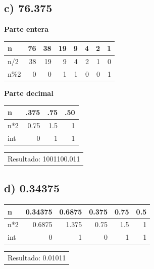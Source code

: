 \documentclass[12pt]{article}
\begin{document}
\subsection*{c) 76.375}
\label{sec:orgbfe72b2}
\begin{mdframed}
\textbf{Parte entera}
\begin{center}
\begin{tabular}{lrrrrrrr}
n & 76 & 38 & 19 & 9 & 4 & 2 & 1\\
\hline
n/2 & 38 & 19 & 9 & 4 & 2 & 1 & 0\\
n\%2 & 0 & 0 & 1 & 1 & 0 & 0 & 1\\
\end{tabular}
\end{center}

\textbf{Parte decimal}
\begin{center}
\begin{tabular}{lrrr}
n & .375 & .75 & .50\\
\hline
n*2 & 0.75 & 1.5 & 1\\
int & 0 & 1 & 1\\
\end{tabular}
\end{center}

\begin{center}
\begin{tabular}{l}
Resultado: 1001100.011\\
\end{tabular}
\end{center}
\end{mdframed}

\subsection*{d) 0.34375}
\label{sec:org78b1ced}
\begin{mdframed}
\begin{center}
\begin{tabular}{lrrrrr}
n & 0.34375 & 0.6875 & 0.375 & 0.75 & 0.5\\
\hline
n*2 & 0.6875 & 1.375 & 0.75 & 1.5 & 1\\
int & 0 & 1 & 0 & 1 & 1\\
\end{tabular}
\end{center}

\begin{center}
\begin{tabular}{l}
Resultado: 0.01011\\
\end{tabular}
\end{center}
\end{mdframed}
\end{document}
